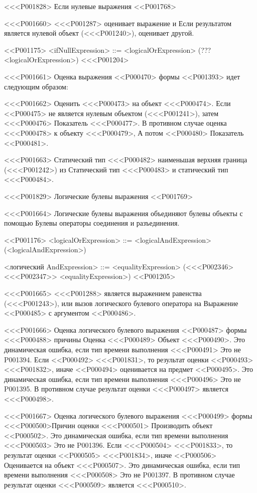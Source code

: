 {{{{{{{{<<<P001828> Если нулевые выражения
<<P001768>

<<<P001660>%
<<<P001287> оценивает выражение и
Если результатом является нулевой объект (<<<P001240>), оценивает другой.

<<P001175>
<ifNullExpression> ::= <logicalOrExpression> (??? <logicalOrExpression>)
<<<P001204>

<<<P001661>%
Оценка выражения <<P000470> формы <<P001393>
идет следующим образом:

<<<P001662>%
Оценить <<<P000473> на объект <<<P000474>.
Если <<P000475> не является нулевым объектом (<<<P001241>), затем <<<P000476> Показатель <<<P000477>.
В противном случае оценка <<<P000478> к объекту <<<P000479>,
А потом <<P000480> Показатель <<P000481>.

<<<P001663>%
Статический тип <<<P000482> наименьшая верхняя граница (<<<P001242>) из
Статический тип <<<P000483> и статический тип <<<P000484>.


<<<P001829> Логические булевы выражения
<<P001769>

<<<P001664>%
Логические булевы выражения объединяют булевы объекты с помощью
Булевы операторы соединения и разъединения.

<<P001176>
<logicalOrExpression> ::= \gnewline{}
<logicalAndExpression> (<logicalAndExpression>)

<логический AndExpression> ::= <equalityExpression> (<<<P002346><<<P002347>> <equalityExpression>)
<<P001205>

<<<P001665>%
<<<P001288> является выражением равенства
(<<<P001243>),
или вызов логического булевого оператора на
Выражение <<P000485> с аргументом <<P000486>.

<<<P001666>%
Оценка логического булевого выражения <<P000487> формы <<<P000488> причины
Оценка <<<P000489> Объект <<<P000490>.
Это динамическая ошибка, если тип времени выполнения <<<P000491> Это не P001394.
Если <<P000492> <<<P001831>, то результат оценки <<P000493> <<<P001832>,
иначе <<P000494> оценивается на предмет <<P000495>.
Это динамическая ошибка, если тип времени выполнения <<<P000496> Это не P001395.
В противном случае результат оценки <<<P000497> является <<<P000498>.

<<<P001667>%
Оценка логического булевого выражения <<<P000499> формы <<<P000500>Причин оценки <<<P000501> Производить объект <<P000502>.
Это динамическая ошибка, если тип времени выполнения <<<P000503> Это не P001396.
Если <<<P000504> <<<P001833>, то результат оценки <<P000505> <<<P001834>,
иначе <<P000506> Оценивается на объект <<<P000507>.
Это динамическая ошибка, если тип времени выполнения <<<P000508> Это не P001397.
В противном случае результат оценки <<<P000509> является <<<P000510>.

}}}}}}}}
